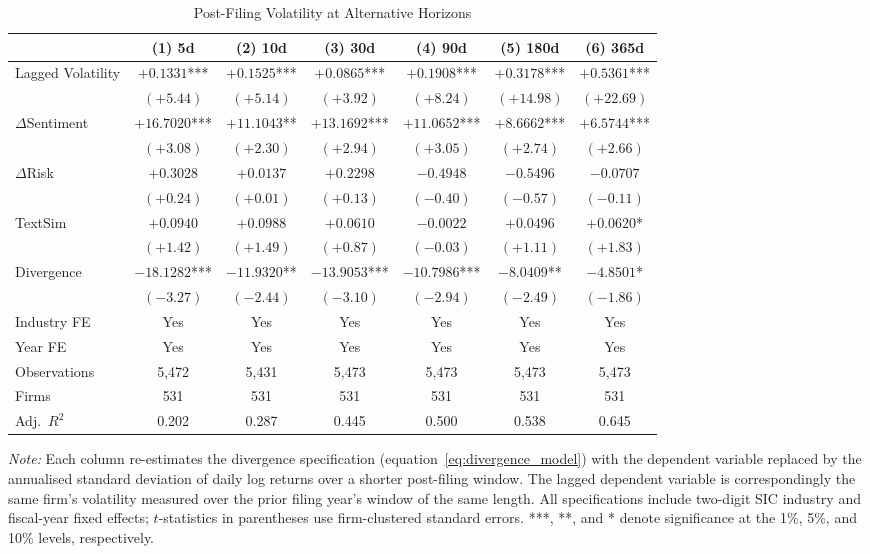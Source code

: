 \begin{table}[htbp]
\centering
\caption{Post-Filing Volatility at Alternative Horizons}
\label{tab:horizons}
\begin{tabular}{lcccccc}
\toprule
 & (1) 5d & (2) 10d & (3) 30d & (4) 90d & (5) 180d & (6) 365d \\
\midrule
Lagged Volatility & $+0.1331$*** & $+0.1525$*** & $+0.0865$*** & $+0.1908$*** & $+0.3178$*** & $+0.5361$*** \\
 & $(+5.44)$ & $(+5.14)$ & $(+3.92)$ & $(+8.24)$ & $(+14.98)$ & $(+22.69)$ \\[4pt]
$\Delta$Sentiment & $+16.7020$*** & $+11.1043$** & $+13.1692$*** & $+11.0652$*** & $+8.6662$*** & $+6.5744$*** \\
 & $(+3.08)$ & $(+2.30)$ & $(+2.94)$ & $(+3.05)$ & $(+2.74)$ & $(+2.66)$ \\[4pt]
$\Delta$Risk & $+0.3028$ & $+0.0137$ & $+0.2298$ & $-0.4948$ & $-0.5496$ & $-0.0707$ \\
 & $(+0.24)$ & $(+0.01)$ & $(+0.13)$ & $(-0.40)$ & $(-0.57)$ & $(-0.11)$ \\[4pt]
TextSim & $+0.0940$ & $+0.0988$ & $+0.0610$ & $-0.0022$ & $+0.0496$ & $+0.0620$* \\
 & $(+1.42)$ & $(+1.49)$ & $(+0.87)$ & $(-0.03)$ & $(+1.11)$ & $(+1.83)$ \\[4pt]
Divergence & $-18.1282$*** & $-11.9320$** & $-13.9053$*** & $-10.7986$*** & $-8.0409$** & $-4.8501$* \\
 & $(-3.27)$ & $(-2.44)$ & $(-3.10)$ & $(-2.94)$ & $(-2.49)$ & $(-1.86)$ \\[4pt]
\midrule
Industry FE & Yes & Yes & Yes & Yes & Yes & Yes \\
Year FE & Yes & Yes & Yes & Yes & Yes & Yes \\
Observations & 5,472 & 5,431 & 5,473 & 5,473 & 5,473 & 5,473 \\
Firms & 531 & 531 & 531 & 531 & 531 & 531 \\
Adj.\ $R^2$ & 0.202 & 0.287 & 0.445 & 0.500 & 0.538 & 0.645 \\
\bottomrule
\end{tabular}
\begin{tablenotes}
\item \textit{Note:} Each column re-estimates the divergence specification (equation~\ref{eq:divergence_model}) with the dependent variable replaced by the annualised standard deviation of daily log returns over a shorter post-filing window. The lagged dependent variable is correspondingly the same firm's volatility measured over the prior filing year's window of the same length. All specifications include two-digit SIC industry and fiscal-year fixed effects; $t$-statistics in parentheses use firm-clustered standard errors. ***, **, and * denote significance at the 1\%, 5\%, and 10\% levels, respectively.
\end{tablenotes}
\end{table}